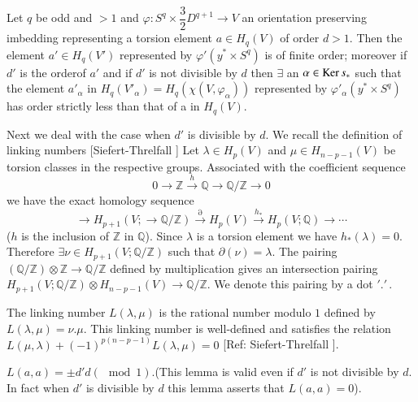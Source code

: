 \begin{lemma}\label{chap1:lem6.3} %
Let $q$ be odd and $ > 1$ and $\varphi : S^q \times \dfrac{3}{2}
D^{q+1} \to V$ an orientation preserving imbedding representing a
torsion element $ a \in H_q (V)$ of order $d>1$. Then the element
$ a' \in H_q (V')$ represented by $ \varphi' (y^* \times S^q ) $
is of finite order; moreover if $d'$ is the order\pageoriginale  of $
a' $ and if 
$d'$ is not divisible by $d$ then $\exists$ an $\alpha \in \operatorname{Ker}
s_*$ such that the element $ a'_\alpha$ in $ H_q (V'_\alpha) = H_q
(\chi (V, \varphi _\alpha))$ represented by $ \varphi'_\alpha (y^*
\times S^q)$ has order strictly less than that of a in $H_q (V)$.  
\end{lemma}

Next we deal with the case when $d'$ is divisible by $d$. We recall
the definition of linking numbers [Siefert-Threlfall \cite{c1:key7}] Let
$\lambda \in H_p (V)$ and $ \mu \in H_{n-p-1} (V) $ be
torsion classes in the respective groups. Associated with the
coefficient sequence  
$$
0 \to \mathbb{Z} \xrightarrow {h} \mathbb{Q} \to \mathbb{Q}/ 
\mathbb{Z}  \to 0 
$$
we have the exact homology sequence 
$$
\to H_{p+1} (V; \to \mathbb{Q}/ \mathbb{Z}) \xrightarrow{\partial} H_p
(V) \xrightarrow {h_*} H_p (V; \mathbb{Q}) \to \cdots 
$$
($h$ is the inclusion of $\mathbb{Z}$ in $\mathbb{Q}$). Since
$\lambda$ is a torsion element we have $h_*(\lambda ) = 0$. Therefore
$ \exists \nu \in H_{p+1} (V; \mathbb{Q} /\mathbb{Z}) $ such that
$ \partial (\nu ) = \lambda$. The pairing $(\mathbb{Q} /\mathbb{Z})
\otimes \mathbb{Z} \to  \mathbb{Q} /\mathbb{Z}$ defined by
multiplication gives an intersection pairing $H_{p+1} (V; \mathbb{Q}/
\mathbb{Z}) \otimes H_{n-p-1} (V) \to \mathbb{Q} /\mathbb{Z} $. We
denote this pairing by a dot $ '.'$\,. 

\setcounter{definition}{3}
\begin{definition} %
The linking number $L(\lambda, \mu )$ is the rational number modulo
$1$ defined by $ L( \lambda, \mu ) = \nu. \mu$. This linking number is
well-defined and satisfies the relation $L(\mu, \lambda) +
(-1)^{p(n-p-1)} L(\lambda, \mu ) =0 $ [Ref: Siefert-Threlfall \cite{c1:key7}]. 
\end{definition}


\setcounter{lemma}{4}
\begin{lemma}\label{chap1:lem6.5} %
$L(a, a) = \pm d' d (\mod 1)$.\pageoriginale (This lemma is valid even
  if $d'$ is not divisible by $d$. In fact when $d'$ is divisible by
  $d$ this lemma asserts that $ L(a, a) = 0$).   
\end{lemma}

